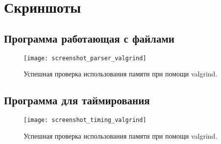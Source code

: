 \section{Скриншоты}

\subsection{Программа работающая с файлами}
\begin{figure}[H]
  \centering
  \texttt{[image: screenshot\_parser\_valgrind]}
  \caption{Успешная проверка использования памяти при помощи valgrind.}
\end{figure}

\subsection{Программа для таймирования}
\begin{figure}[H]
  \centering
  \texttt{[image: screenshot\_timing\_valgrind]}
  \caption{Успешная проверка использования памяти при помощи valgrind.}
\end{figure}
